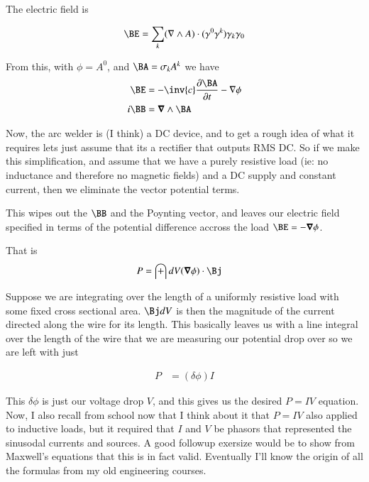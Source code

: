 \documentclass{article}
\begin{document}
The electric field is

\begin{align*}
\BE &= \sum_k (\grad \wedge A) \cdot (\gamma^0 \gamma^k) \gamma_k \gamma_0 \\
\end{align*}

From this, with $\phi = A^0$, and $\BA = \sigma_k A^k$ we have
\begin{align*}
\BE &= -\inv{c} \PD{t}{\BA} - \grad \phi \\
i\BB &= \spacegrad \wedge \BA
\end{align*}

Now, the arc welder is (I think) a DC device, and to 
get a rough idea of what it requires lets just assume that its a rectifier that outputs RMS DC.
So if we make this simplification, and assume that we have a 
purely resistive load (ie: no inductance and therefore no magnetic fields) and a DC supply and constant current, then
we eliminate the vector potential terms.

This wipes out the $\BB$ and the Poynting vector, and leaves our electric field specified in terms
of the potential difference accross the load $\BE = -\spacegrad \phi$.

That is
\begin{align*}
P &= \int dV (\spacegrad \phi) \cdot \Bj
\end{align*}

Suppose we are integrating over the length of a uniformly resistive load with some fixed cross sectional area.  $\Bj dV$ is then the magnitude of the current directed along the wire for its length.  This basically leaves us with a line integral over the length of the wire that we are measuring our potential drop over so we are left with just

\begin{align*}
P &= (\delta \phi) I
\end{align*}

This $\delta \phi$ is just our voltage drop $V$, and this gives us the desired $P = I V$ equation.
Now, I also recall from school
now that I think about it that $P = I V$ also applied to inductive loads, but it required that $I$ and $V$ be phasors that
represented the sinusodal currents and sources.  A good followup exersize would be to show from Maxwell's equations
that this is in fact valid.  Eventually I'll know the origin of all the formulas from my old engineering courses.

%
%
\end{document}
